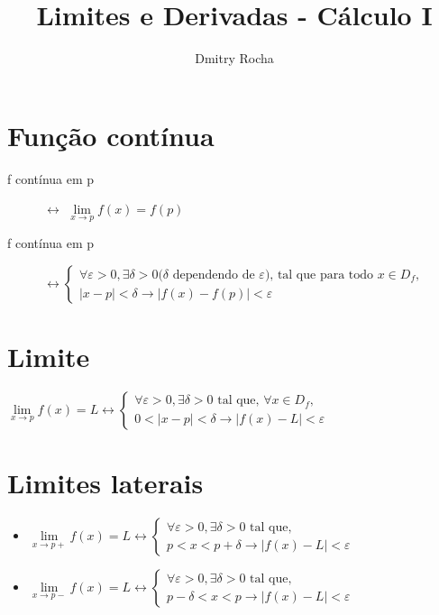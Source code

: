 \documentclass[11pt]{article}
\author{Dmitry Rocha}
\title{Limites e Derivadas - Cálculo I}
\newcommand{\limit}[3]{{
  \underset{#1 \rightarrow #2}{\lim} #3
}}
\begin{document}
\section{Função contínua}

\begin{description}
  \item[f contínua em p] $\leftrightarrow$
  $\underset{x\rightarrow p}{\lim } f(x) = f(p)$

  \item[f contínua em p]

$
\leftrightarrow
  \begin{cases}
    \forall \varepsilon > 0, \exists \delta > 0 (\delta\text{ dependendo de }
    \varepsilon\text{), tal que para todo }x \in D_f, \\
    |x-p| < \delta \to |f(x) - f(p)| < \varepsilon
  \end{cases}
$

\end{description}

\section{Limite}

$
\limit{x}{p}{f(x)} = L \leftrightarrow
  \begin{cases}
    \forall \varepsilon > 0 , \exists \delta > 0\text{ tal que, }\forall x \in D_f, \\
    0< |x-p| < \delta \to |f(x) - L| < \varepsilon
  \end{cases}
$

\section{Limites laterais}

\begin{itemize}
\item
$
\limit{x}{p+}{f(x)} = L \leftrightarrow
  \begin{cases}
    \forall \varepsilon > 0 , \exists \delta > 0\text{ tal que, } \\
    p < x < p+\delta \to |f(x) - L| < \varepsilon
  \end{cases}
$

\item
$
\limit{x}{p-}{f(x)} = L \leftrightarrow
  \begin{cases}
    \forall \varepsilon > 0 , \exists \delta > 0\text{ tal que, } \\
    p - \delta < x < p \to |f(x) - L| < \varepsilon
  \end{cases}
$
\end{itemize}
\end{document}
